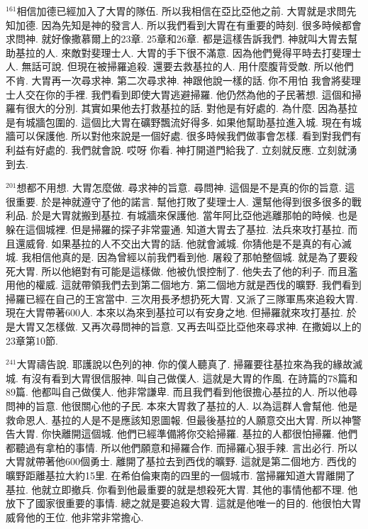 \documentclass{book}
\begin{document}
$^{161}$相信加德已經加入了大胃的隊伍.
所以我相信在亞比亞他之前.
大胃就是求問先知加德.
因為先知是神的發言人.
所以我們看到大胃在有重要的時刻.
很多時候都會求問神.
就好像撒慕爾上的23章.
25章和26章.
都是這樣告訴我們.
神就叫大胃去幫助基拉的人.
來敵對斐理士人.
大胃的手下很不滿意.
因為他們覺得平時去打斐理士人.
無話可說.
但現在被掃羅追殺.
還要去救基拉的人.
用什麼腹背受敵.
所以他們不肯.
大胃再一次尋求神.
第二次尋求神.
神跟他說一樣的話.
你不用怕 我會將斐理士人交在你的手裡.
我們看到即使大胃逃避掃羅.
他仍然為他的子民著想.
這個和掃羅有很大的分別.
其實如果他去打救基拉的話.
對他是有好處的.
為什麼.
因為基拉是有城牆包圍的.
這個比大胃在礦野飄流好得多.
如果他幫助基拉進入城.
現在有城牆可以保護他.
所以對他來說是一個好處.
很多時候我們做事會怎樣.
看到對我們有利益有好處的.
我們就會說.
哎呀 你看.
神打開道門給我了.
立刻就反應.
立刻就湧到去.

$^{201}$想都不用想.
大胃怎麼做.
尋求神的旨意.
尋問神.
這個是不是真的你的旨意.
這很重要.
於是神就遵守了他的諾言.
幫他打敗了斐理士人.
還幫他得到很多很多的戰利品.
於是大胃就搬到基拉.
有城牆來保護他.
當年阿比亞他逃離那帕的時候.
也是躲在這個城裡.
但是掃羅的探子非常靈通.
知道大胃去了基拉.
法兵來攻打基拉.
而且還威脅.
如果基拉的人不交出大胃的話.
他就會滅城.
你猜他是不是真的有心滅城.
我相信他真的是.
因為曾經以前我們看到他.
屠殺了那帕整個城.
就是為了要殺死大胃.
所以他絕對有可能是這樣做.
他被仇恨控制了.
他失去了他的利子.
而且濫用他的權威.
這就帶領我們去到第二個地方.
第二個地方就是西伐的曠野.
我們看到掃羅已經在自己的王宮當中.
三次用長矛想扔死大胃.
又派了三隊軍馬來追殺大胃.
現在大胃帶著600人.
本來以為來到基拉可以有安身之地.
但掃羅就來攻打基拉.
於是大胃又怎樣做.
又再次尋問神的旨意.
又再去叫亞比亞他來尋求神.
在撒姆以上的23章第10節.

$^{241}$大胃禱告說.
耶護說以色列的神.
你的僕人聽真了.
掃羅要往基拉來為我的緣故滅城.
有沒有看到大胃很信服神.
叫自己做僕人.
這就是大胃的作風.
在詩篇的78篇和89篇.
他都叫自己做僕人.
他非常謙卑.
而且我們看到他很擔心基拉的人.
所以他尋問神的旨意.
他很關心他的子民.
本來大胃救了基拉的人.
以為這群人會幫他.
他是救命恩人.
基拉的人是不是應該知恩圖報.
但最後基拉的人願意交出大胃.
所以神警告大胃.
你快離開這個城.
他們已經準備將你交給掃羅.
基拉的人都很怕掃羅.
他們都聽過有拿柏的事情.
所以他們願意和掃羅合作.
而掃羅心狠手辣.
言出必行.
所以大胃就帶著他600個勇士.
離開了基拉去到西伐的曠野.
這就是第二個地方.
西伐的曠野距離基拉大約15里.
在希伯倫東南的四里的一個城市.
當掃羅知道大胃離開了基拉.
他就立即撤兵.
你看到他最重要的就是想殺死大胃.
其他的事情他都不理.
他放下了國家很重要的事情.
總之就是要追殺大胃.
這就是他唯一的目的.
他很怕大胃威脅他的王位.
他非常非常擔心.
\end{document}

